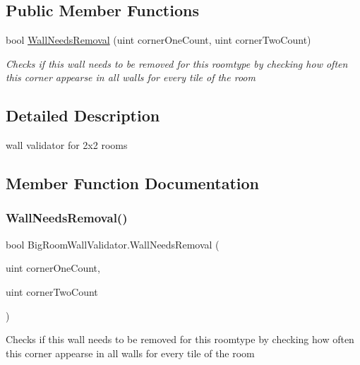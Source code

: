 \subsection*{Public Member Functions}
\begin{DoxyCompactItemize}
\item 
bool \mbox{\hyperlink{class_big_room_wall_validator_abc5968ccc9e70e3d5b8de7ccff2c69bb}{Wall\+Needs\+Removal}} (uint corner\+One\+Count, uint corner\+Two\+Count)
\begin{DoxyCompactList}\small\item\em Checks if this wall needs to be removed for this roomtype by checking how often this corner appearse in all walls for every tile of the room \end{DoxyCompactList}\end{DoxyCompactItemize}


\subsection{Detailed Description}
wall validator for 2x2 rooms 



\subsection{Member Function Documentation}
\mbox{\label{class_big_room_wall_validator_abc5968ccc9e70e3d5b8de7ccff2c69bb}} 
\subsubsection{\texorpdfstring{Wall\+Needs\+Removal()}{WallNeedsRemoval()}}
{\footnotesize\ttfamily bool Big\+Room\+Wall\+Validator.\+Wall\+Needs\+Removal (\begin{DoxyParamCaption}\item[{uint}]{corner\+One\+Count,  }\item[{uint}]{corner\+Two\+Count }\end{DoxyParamCaption})}



Checks if this wall needs to be removed for this roomtype by checking how often this corner appearse in all walls for every tile of the room 

